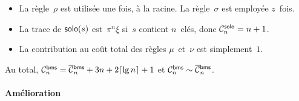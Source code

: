 \begin{itemize}
  \item La règle~\(\rho\) est utilisée une fois, à la racine. La
    règle~\(\sigma\) est employée \(z\)~fois.

  \item La trace de \(\fun{solo}(s)\)
    est~\(\pi^n\xi\) si~\(s\) contient \(n\)~clés, donc
    \(\C{\fun{solo}}{n} = n + 1\).

  \item La contribution au coût total des règles
    \(\mu\)~et~\(\nu\) est simplement~\(1\).

\end{itemize}
Au total, \(\C{\fun{bms}}{n} = \OC{\fun{bms}}{n} + 3n + 2\ceiling{\lg
  n} + 1\) et \(\C{\fun{bms}}{n} \sim
\OC{\fun{bms}}{n}\).

\paragraph{Amélioration}

